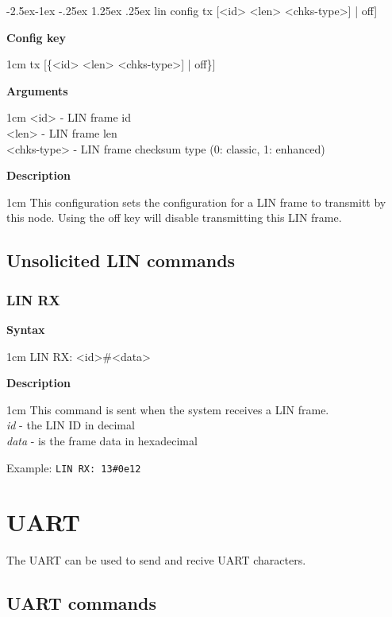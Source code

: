 \documentclass{article}[a4paper]
\makeatletter
\newcommand\subsubsubsection{\@startsection{paragraph}{4}{\z@}%
            {-2.5ex\@plus -1ex \@minus -.25ex}%
            {1.25ex \@plus .25ex}%
            {\normalfont\normalsize\bfseries}}
\makeatother
\begin{document}
\subsubsubsection{lin config tx [<id> <len> <chks-type>] | off]}
\begin{tcolorbox}
	{\bf Config key}

	 1cm \dimexpr\linewidth-2cm\relax
	tx [\{<id> <len> <chks-type>] | off\}]

	\medskip
	{\bf Arguments}

	 1cm \dimexpr\linewidth-2cm\relax
	<id> - LIN frame id \\
	<len> - LIN frame len \\
	<chks-type> - LIN frame checksum type (0: classic, 1: enhanced)

	\medskip
	{\bf Description}

	 1cm \dimexpr\linewidth-2cm\relax
	This configuration sets the configuration for a LIN frame to transmitt by this
	node. Using the off key will disable transmitting this LIN frame.
\end{tcolorbox}

\subsection{Unsolicited LIN commands}

\subsubsection{LIN RX}
\begin{tcolorbox}
	{\bf Syntax}

	 1cm \dimexpr\linewidth-2cm\relax
	LIN RX: <id>\#<data>

	\medskip
	{\bf Description}

	 1cm \dimexpr\linewidth-2cm\relax
	This command is sent when the system receives a LIN frame.
	\medskip \\
	{\it id} - the LIN ID in decimal \\
	{\it data} - is the frame data in hexadecimal

	\medskip
	Example: \texttt{LIN RX: 13\#0e12}
\end{tcolorbox}

\section{UART}

The UART can be used to send and recive UART characters.


\subsection{UART commands}
\end{document}
